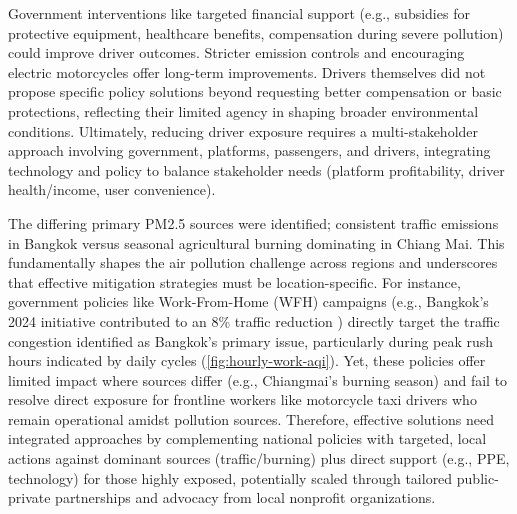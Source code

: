 Government interventions like targeted financial support (e.g., subsidies for protective equipment, healthcare benefits, compensation during severe pollution) could improve driver outcomes.
Stricter emission controls and encouraging electric motorcycles offer long-term improvements.
Drivers themselves did not propose specific policy solutions beyond requesting better compensation or basic protections,
reflecting their limited agency in shaping broader environmental conditions.
Ultimately, reducing driver exposure requires a multi-stakeholder approach involving government, platforms, passengers, and drivers, integrating technology and policy to balance stakeholder needs (platform profitability, driver health/income, user convenience).

The differing primary PM2.5 sources were identified; consistent traffic emissions in Bangkok versus seasonal agricultural burning dominating in Chiang Mai. 
This fundamentally shapes the air pollution challenge across regions and underscores that effective mitigation strategies must be location-specific. 
For instance, government policies like Work-From-Home (WFH) campaigns (e.g., Bangkok's 2024 initiative contributed to an 8\% traffic reduction  \cite{Wipatayotin_2025}) directly target the traffic congestion identified as Bangkok's primary issue, particularly during peak rush hours indicated by daily cycles (\autoref{fig:hourly-work-aqi}). 
Yet, these policies offer limited impact where sources differ (e.g., Chiangmai's burning season) and fail to resolve direct exposure for frontline workers like motorcycle taxi drivers who remain operational amidst pollution sources.
Therefore, effective solutions need integrated approaches by complementing national policies with targeted, local actions against dominant sources (traffic/burning) plus direct support (e.g., PPE, technology) for those highly exposed, potentially scaled through tailored public-private partnerships and advocacy from local nonprofit organizations.



